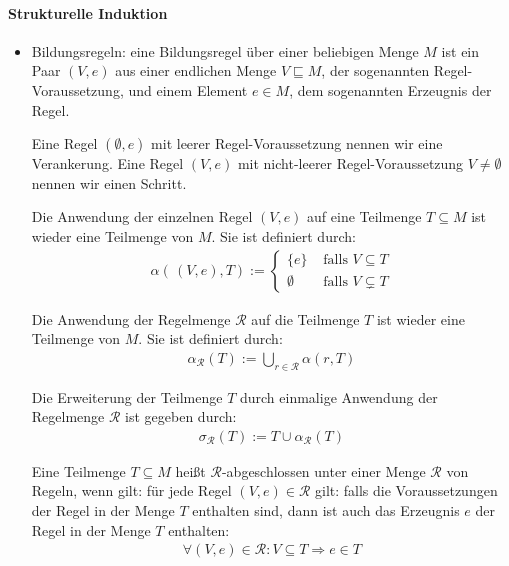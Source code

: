 \documentclass[
  a4paper,
  11pt,
]{scrartcl}
\newcommand{\Rc}{\mathcal{R}}
\begin{document}
\paragraph{Strukturelle Induktion}
\label{par:strukturelle_induktion}

\begin{itemize}
  \item Bildungsregeln: eine Bildungsregel über einer beliebigen Menge $M$ ist
    ein Paar $(V, e)$ aus einer endlichen Menge $V \sqsubseteq M$, der
    sogenannten Regel-Voraussetzung, und einem Element $e \in M$, dem
    sogenannten Erzeugnis der Regel.

    Eine Regel $(\emptyset, e)$ mit leerer Regel-Voraussetzung nennen wir eine
    Verankerung. Eine Regel $(V, e)$ mit nicht-leerer Regel-Voraussetzung $V
    \neq \emptyset$ nennen wir einen Schritt.

    Die Anwendung der einzelnen Regel $(V, e)$ auf eine Teilmenge $T \subseteq
    M$ ist wieder eine Teilmenge von $M$. Sie ist definiert durch:
    \begin{align*}
      \alpha( \, (V, e), T) :=
      \begin{cases}
        \{ e \} & \text{ falls } V \subseteq T\\
        \emptyset & \text{ falls } V \subsetneq T
      \end{cases}
    \end{align*}

    Die Anwendung der Regelmenge $\Rc$ auf die Teilmenge $T$ ist wieder eine
    Teilmenge von $M$. Sie ist definiert durch:
    \begin{align*}
      \alpha_{\Rc}(T) := \bigcup\limits_{r \in \Rc} \alpha(r, T)
    \end{align*}

    Die Erweiterung der Teilmenge $T$ durch einmalige Anwendung der Regelmenge
    $\Rc$ ist gegeben durch:
    \begin{align*}
      \sigma_{\Rc}(T) := T \cup \alpha_{\Rc}(T)
    \end{align*}

    Eine Teilmenge $T \subseteq M$ heißt $\Rc$-abgeschlossen unter einer Menge
    $\Rc$ von Regeln, wenn gilt: für jede Regel $(V, e) \in \Rc$ gilt: falls die
    Voraussetzungen der Regel in der Menge $T$ enthalten sind, dann ist auch das
    Erzeugnis $e$ der Regel in der Menge $T$ enthalten:
    \begin{align*}
      \forall (V, e) \in \Rc: V \subseteq T \Rightarrow e \in T
    \end{align*}
\end{itemize}
\end{document}
